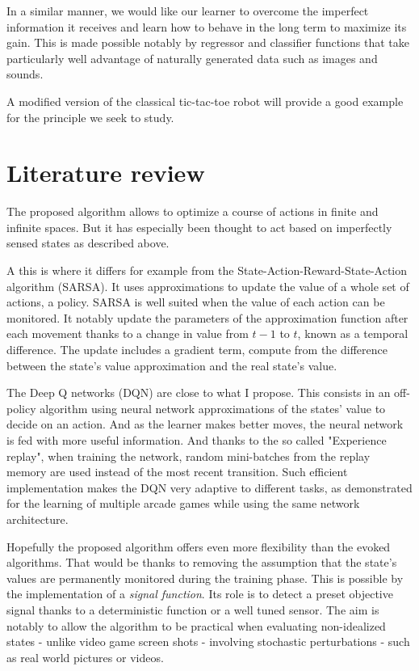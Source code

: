 \documentclass[letterpaper, 10.5 pt, conference]{ieeeconf}
\begin{document}
In a similar manner, we would like our learner to overcome the imperfect information it receives and learn how to behave in the long term to maximize its gain. This is made possible notably by regressor and classifier functions that take particularly well advantage of naturally generated data such as images and sounds.

A modified version of the classical tic-tac-toe robot will provide a good example for the principle we seek to study.

\section{Literature review}

The proposed algorithm allows to optimize a course of actions in finite and infinite spaces. But it has especially been thought to act based on imperfectly sensed states as described above.

A this is where it differs for example from the State-Action-Reward-State-Action algorithm (SARSA). It uses approximations to update the value of a whole set of actions, a policy. SARSA is well suited when the value of each action can be monitored. It notably update the parameters of the approximation function after each movement thanks to a change in value from $t-1$ to $t$, known as a temporal difference. The update includes a gradient term, compute from the difference between the state's value approximation and the real state's value.

The Deep Q networks (DQN) are close to what I propose. This consists in an off-policy algorithm using neural network approximations of the states' value to decide on an action. And as the learner makes better moves, the neural network is fed with more useful information. And thanks to the so called "Experience replay", when training the network, random mini-batches from the replay memory are used instead of the most recent transition. Such efficient implementation makes the DQN very adaptive to different tasks, as demonstrated for the learning of multiple arcade games while using the same network architecture. 

Hopefully the proposed algorithm offers even more flexibility than the evoked algorithms. That would be thanks to removing the assumption that the state's values are permanently monitored during the training phase. This is possible by the implementation of a \textit{signal function}. Its role is to detect a preset objective signal thanks to a deterministic function or a well tuned sensor. The aim is notably to allow the algorithm to be practical when evaluating non-idealized states - unlike video game screen shots - involving stochastic perturbations - such as real world pictures or videos.
\end{document}
